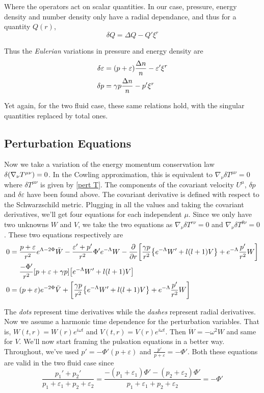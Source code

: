 \documentclass[12pt, letterpaper]{report}
\begin{document}
Where the operators act on scalar quantities. In our case, pressure, energy density and number density only have a radial dependance, and thus for a quantity $Q(r)$, \[\delta Q= \Delta Q- Q'\xi^r\]

Thus the \emph{Eulerian} variations in pressure and energy density are
\begin{align}
    \delta \varepsilon&= \qty(p+\varepsilon)\frac{\Delta n}{n} - \varepsilon'\xi^r\\
    \delta p&= \gamma p\frac{\Delta n}{n} - p'\xi^r
\end{align}

Yet again, for the two fluid case, these same relations hold, with the singular quantities replaced by total ones. 

\subsection{Perturbation Equations}

Now we take a variation of the energy momentum conservation law $\delta\qty(\nabla_\nu T^{\mu\nu})=0$. In the Cowling approximation, this is equivalent to $\nabla_\nu\delta T^{\mu\nu}=0$ where $\delta T^{\mu\nu}$ is given by \cref{pert T}. The components of the covariant velocity $U^\mu$, $\delta p$ and $\delta \varepsilon$ have been found above. The covariant derivative is defined with respect to the Schwarzschild metric. Plugging in all the values and taking the covariant derivatives, we'll get four equations for each independent $\mu$. Since we only have two unknowns $W$ and $V$, we take the two equations as $\nabla_\nu\delta T^{r\nu}=0$ and $\nabla_\nu\delta T^{\theta\nu}=0$. These two equations respectively are 
\begin{align}
    0={}& \frac{p+\varepsilon}{r^2}e^{\Lambda-2\Phi}\ddot{W}-
    \frac{\varepsilon'+p'}{r^2}\Phi' e^{-\Lambda}{W}-
    \pdv{}{r}\qty[\frac{\gamma p}{r^2}\qty{e^{-\Lambda}W'+l(l+1)V}+e^{-\Lambda}\frac{p'}{r^2}W]\nonumber\\
    &\frac{-\Phi'}{r^2}\qty[p+\varepsilon+ \gamma p]\qty[e^{-\Lambda}W'+l(l+1)V]\label{pulse1 step1}\\
   0={}& \qty(p+\varepsilon)e^{-2\Phi}\ddot{V}+\qty[\frac{\gamma p}{r^2}\qty{e^{-\Lambda}W'+l(l+1)V}+e^{-\Lambda}\frac{p'}{r^2}W]\label{pulse2 step1}
\end{align}

The \emph{dots} represent time derivatives while the \emph{dashes} represent radial derivatives. Now we assume a harmonic time dependence for the perturbation variables. That is, $W(t,r)= W(r)e^{i\omega t}$ and $V(t,r)= V(r)e^{i\omega t}$. Then $\ddot {W}= -\omega^2 W$ and same for $V$. We'll now start framing the pulsation equations in a better way. Throughout, we've used $p'= -\Phi'(p+\varepsilon)$ and $\frac{p'}{p+\varepsilon}= -\Phi'$. Both these equations are valid in the two fluid case since 
\[\frac{p_1'+p_2'}{p_1+\varepsilon_1+p_2+\varepsilon_2}=\frac{-(p_1+\varepsilon_1)\Phi'-(p_2+\varepsilon_2)\Phi'}{p_1+\varepsilon_1+p_2+\varepsilon_2}= -\Phi' \]
\end{document}

